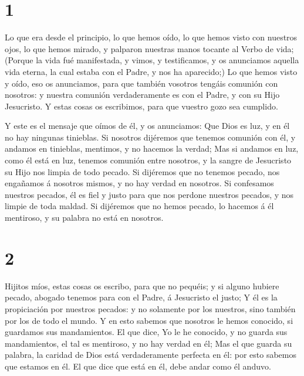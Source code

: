 \hypertarget{section}{%
\section{1}\label{section}}

 Lo que era desde el principio, lo que hemos oído, lo que
hemos visto con nuestros ojos, lo que hemos mirado, y palparon nuestras
manos tocante al Verbo de vida;  (Porque la vida fué
manifestada, y vimos, y testificamos, y os anunciamos aquella vida
eterna, la cual estaba con el Padre, y nos ha aparecido;) 
Lo que hemos visto y oído, eso os anunciamos, para que también vosotros
tengáis comunión con nosotros: y nuestra comunión verdaderamente es con
el Padre, y con su Hijo Jesucristo.  Y estas cosas os
escribimos, para que vuestro gozo sea cumplido.

 Y este es el mensaje que oímos de él, y os anunciamos: Que
Dios es luz, y en él no hay ningunas tinieblas.  Si nosotros
dijéremos que tenemos comunión con él, y andamos en tinieblas, mentimos,
y no hacemos la verdad;  Mas si andamos en luz, como él está
en luz, tenemos comunión entre nosotros, y la sangre de Jesucristo su
Hijo nos limpia de todo pecado.  Si dijéremos que no tenemos
pecado, nos engañamos á nosotros mismos, y no hay verdad en nosotros.
 Si confesamos nuestros pecados, él es fiel y justo para que
nos perdone nuestros pecados, y nos limpie de toda maldad. 
Si dijéremos que no hemos pecado, lo hacemos á él mentiroso, y su
palabra no está en nosotros.

\hypertarget{section-1}{%
\section{2}\label{section-1}}

 Hijitos míos, estas cosas os escribo, para que no pequéis;
y si alguno hubiere pecado, abogado tenemos para con el Padre, á
Jesucristo el justo;  Y él es la propiciación por nuestros
pecados: y no solamente por los nuestros, sino también por los de todo
el mundo.  Y en esto sabemos que nosotros le hemos conocido,
si guardamos sus mandamientos.  El que dice, Yo le he
conocido, y no guarda sus mandamientos, el tal es mentiroso, y no hay
verdad en él;  Mas el que guarda su palabra, la caridad de
Dios está verdaderamente perfecta en él: por esto sabemos que estamos en
él.  El que dice que está en él, debe andar como él anduvo.


